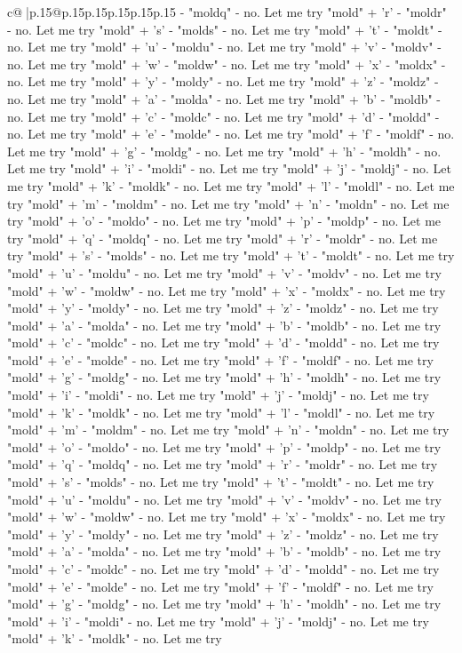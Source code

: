 \documentclass{article}
\begin{document}
{\begin{supertabular}{c@{$\;$}|p{.15\linewidth}@{}p{.15\linewidth}p{.15\linewidth}p{.15\linewidth}p{.15\linewidth}p{.15\linewidth}}
{{{{-} "moldq" {-} no. Let me try "mold" + 'r' {-} "moldr" {-} no. Let me try "mold" + 's' {-} "molds" {-} no. Let me try "mold" + 't' {-} "moldt" {-} no. Let me try "mold" + 'u' {-} "moldu" {-} no. Let me try "mold" + 'v' {-} "moldv" {-} no. Let me try "mold" + 'w' {-} "moldw" {-} no. Let me try "mold" + 'x' {-} "moldx" {-} no. Let me try "mold" + 'y' {-} "moldy" {-} no. Let me try "mold" + 'z' {-} "moldz" {-} no. Let me try "mold" + 'a' {-} "molda" {-} no. Let me try "mold" + 'b' {-} "moldb" {-} no. Let me try "mold" + 'c' {-} "moldc" {-} no. Let me try "mold" + 'd' {-} "moldd" {-} no. Let me try "mold" + 'e' {-} "molde" {-} no. Let me try "mold" + 'f' {-} "moldf" {-} no. Let me try "mold" + 'g' {-} "moldg" {-} no. Let me try "mold" + 'h' {-} "moldh" {-} no. Let me try "mold" + 'i' {-} "moldi" {-} no. Let me try "mold" + 'j' {-} "moldj" {-} no. Let me try "mold" + 'k' {-} "moldk" {-} no. Let me try "mold" + 'l' {-} "moldl" {-} no. Let me try "mold" + 'm' {-} "moldm" {-} no. Let me try "mold" + 'n' {-} "moldn" {-} no. Let me try "mold" + 'o' {-} "moldo" {-} no. Let me try "mold" + 'p' {-} "moldp" {-} no. Let me try "mold" + 'q' {-} "moldq" {-} no. Let me try "mold" + 'r' {-} "moldr" {-} no. Let me try "mold" + 's' {-} "molds" {-} no. Let me try "mold" + 't' {-} "moldt" {-} no. Let me try "mold" + 'u' {-} "moldu" {-} no. Let me try "mold" + 'v' {-} "moldv" {-} no. Let me try "mold" + 'w' {-} "moldw" {-} no. Let me try "mold" + 'x' {-} "moldx" {-} no. Let me try "mold" + 'y' {-} "moldy" {-} no. Let me try "mold" + 'z' {-} "moldz" {-} no. Let me try "mold" + 'a' {-} "molda" {-} no. Let me try "mold" + 'b' {-} "moldb" {-} no. Let me try "mold" + 'c' {-} "moldc" {-} no. Let me try "mold" + 'd' {-} "moldd" {-} no. Let me try "mold" + 'e' {-} "molde" {-} no. Let me try "mold" + 'f' {-} "moldf" {-} no. Let me try "mold" + 'g' {-} "moldg" {-} no. Let me try "mold" + 'h' {-} "moldh" {-} no. Let me try "mold" + 'i' {-} "moldi" {-} no. Let me try "mold" + 'j' {-} "moldj" {-} no. Let me try "mold" + 'k' {-} "moldk" {-} no. Let me try "mold" + 'l' {-} "moldl" {-} no. Let me try "mold" + 'm' {-} "moldm" {-} no. Let me try "mold" + 'n' {-} "moldn" {-} no. Let me try "mold" + 'o' {-} "moldo" {-} no. Let me try "mold" + 'p' {-} "moldp" {-} no. Let me try "mold" + 'q' {-} "moldq" {-} no. Let me try "mold" + 'r' {-} "moldr" {-} no. Let me try "mold" + 's' {-} "molds" {-} no. Let me try "mold" + 't' {-} "moldt" {-} no. Let me try "mold" + 'u' {-} "moldu" {-} no. Let me try "mold" + 'v' {-} "moldv" {-} no. Let me try "mold" + 'w' {-} "moldw" {-} no. Let me try "mold" + 'x' {-} "moldx" {-} no. Let me try "mold" + 'y' {-} "moldy" {-} no. Let me try "mold" + 'z' {-} "moldz" {-} no. Let me try "mold" + 'a' {-} "molda" {-} no. Let me try "mold" + 'b' {-} "moldb" {-} no. Let me try "mold" + 'c' {-} "moldc" {-} no. Let me try "mold" + 'd' {-} "moldd" {-} no. Let me try "mold" + 'e' {-} "molde" {-} no. Let me try "mold" + 'f' {-} "moldf" {-} no. Let me try "mold" + 'g' {-} "moldg" {-} no. Let me try "mold" + 'h' {-} "moldh" {-} no. Let me try "mold" + 'i' {-} "moldi" {-} no. Let me try "mold" + 'j' {-} "moldj" {-} no. Let me try "mold" + 'k' {-} "moldk" {-} no. Let me try }}}
\end{supertabular}}
\end{document}
